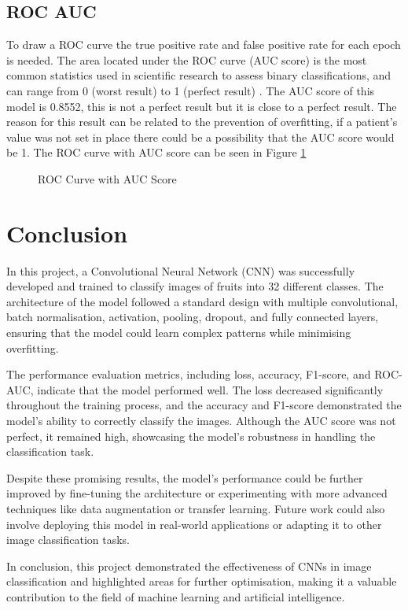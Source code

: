 \documentclass[a4paper,oneside,11pt]{book}
\begin{document}
\newpage
\section{ROC AUC}

To draw a ROC curve the true positive rate and false positive rate for each epoch is needed. The area located under the ROC curve (AUC score) is  the most common statistics used in scientific research to assess binary classifications, and can range from 0 (worst result) to 1 (perfect result) \citep{chicco2023matthews}. The AUC score of this model is 0.8552, this is not a perfect result but it is close to a perfect result. The reason for this result can be related to the prevention of overfitting, if a patient's value was not set in place there could be a possibility that the AUC score would be 1. The ROC curve with AUC score can be seen in Figure \ref{figROC/AUC}

\begin{figure}[h]
    \centering
    \caption{ROC Curve with AUC Score}
    \label{figROC/AUC}
\end{figure}

\chapter[Conclusion]{Conclusion}

In this project, a Convolutional Neural Network (CNN) was successfully developed and trained to classify images of fruits into 32 different classes. The architecture of the model followed a standard design with multiple convolutional, batch normalisation, activation, pooling, dropout, and fully connected layers, ensuring that the model could learn complex patterns while minimising overfitting.

The performance evaluation metrics, including loss, accuracy, F1-score, and ROC-AUC, indicate that the model performed well. The loss decreased significantly throughout the training process, and the accuracy and F1-score demonstrated the model's ability to correctly classify the images. Although the AUC score was not perfect, it remained high, showcasing the model's robustness in handling the classification task.

Despite these promising results, the model's performance could be further improved by fine-tuning the architecture or experimenting with more advanced techniques like data augmentation or transfer learning. Future work could also involve deploying this model in real-world applications or adapting it to other image classification tasks.

In conclusion, this project demonstrated the effectiveness of CNNs in image classification and highlighted areas for further optimisation, making it a valuable contribution to the field of machine learning and artificial intelligence.


\end{document}
